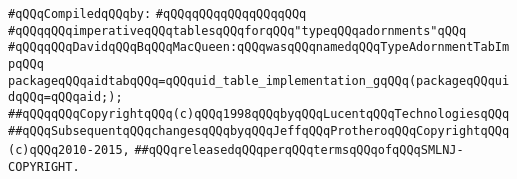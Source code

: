 \label{src/lib/c-kit/src/ast/aidtab.pkg}
\newline
\verb|#qQQqCompiledqQQqby:|\newline
\verb|#qQQqqQQqqQQqqQQqqQQq|\newline
\newline
\verb|#qQQqqQQqimperativeqQQqtablesqQQqforqQQq"typeqQQqadornments"qQQq|\newline
\verb|#qQQqqQQqDavidqQQqBqQQqMacQueen:qQQqwasqQQqnamedqQQqTypeAdornmentTabImpqQQq|\newline
\newline
\verb|packageqQQqaidtabqQQq=qQQquid_table_implementation_gqQQq(packageqQQquidqQQq=qQQqaid;);|\newline
\newline
\newline
\verb|##qQQqqQQqCopyrightqQQq(c)qQQq1998qQQqbyqQQqLucentqQQqTechnologiesqQQq|\newline
\verb|##qQQqSubsequentqQQqchangesqQQqbyqQQqJeffqQQqProtheroqQQqCopyrightqQQq(c)qQQq2010-2015,|\newline
\verb|##qQQqreleasedqQQqperqQQqtermsqQQqofqQQqSMLNJ-COPYRIGHT.|\newline

